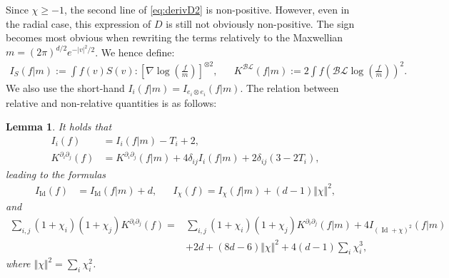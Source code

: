 \documentclass[11pt,a4paper]{article}
\theoremstyle{definition}
\theoremstyle{plain}
\newtheorem{lemma}[defi]{Lemma}
\DeclareMathOperator*{\Id}{Id}
\begin{document}
Since $\chi \geq -1$, the second line of \eqref{eq:derivD2} is non-positive. However, even in the radial case, this expression of $D$ is still not obviously non-positive. The sign becomes most obvious when rewriting the terms relatively to the Maxwellian $m=(2\pi)^{d/2}e^{-\vert v\vert^2/2}$.
We hence define:
\begin{align*}
    I_S(f\vert m) := \int f (v)S(v):\left[\nabla \log\left(\frac{f}{m}\right)\right]^{\otimes 2},&&K^{\mathcal{B}\mathcal{L}}(f\vert m) :=2\int f\left(\mathcal{B}\mathcal{L}\log\left(\frac{f}{m}\right)\right)^2.
\end{align*}
We also use the short-hand $I_i(f\vert m)=I_{e_i\otimes e_i}(f\vert m)$. The relation between relative and non-relative quantities is as follows:
\begin{lemma}
\label{lem:relat}
    It holds that
    \begin{align*}
        I_{i}(f) &=  I_{i}(f\vert m)-T_i +2, \\
        K^{\partial_i\partial_j}(f)
        &= K^{\partial_i\partial_j}(f\vert m)+4\delta_{ij}I_{i}(f\vert m)+2\delta_{ij}(3-2T_i),
    \end{align*}
leading to the formulas
\begin{align*}
    I_{\Id}(f)&=I_{\Id}(f\vert m)+d, && I_\chi(f)=I_\chi(f\vert m)+(d-1)\Vert \chi\Vert^2,
\end{align*}
and
\begin{align*}
    \sum_{i,j}(1+\chi_i)(1+\chi_j)K^{\partial_i\partial_j}(f)=&\sum_{i,j}(1+\chi_i)(1+\chi_j)K^{\partial_i\partial_j}(f\vert m)+4I_{(\Id + \chi)^2}(f\vert m)\\
    &+2d+(8d-6)\Vert \chi\Vert^2+4(d-1)\sum_i\chi_i^3,
\end{align*}
where $\Vert \chi\Vert^2=\sum_i \chi_i^2$.
\end{lemma}
\end{document}
